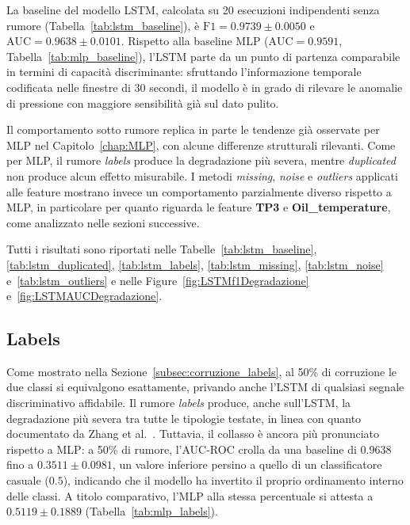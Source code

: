\documentclass[../main.tex]{subfiles}
\begin{document}
La baseline del modello LSTM, calcolata su 20 esecuzioni indipendenti senza rumore (Tabella~\ref{tab:lstm_baseline}), è $\text{F1} = 0.9739 \pm 0.0050$ e $\text{AUC} = 0.9638 \pm 0.0101$. Rispetto alla baseline MLP ($\text{AUC} = 0.9591$, Tabella~\ref{tab:mlp_baseline}), l'LSTM parte da un punto di partenza comparabile in termini di capacità discriminante: sfruttando l'informazione temporale codificata nelle finestre di 30 secondi, il modello è in grado di rilevare le anomalie di pressione con maggiore sensibilità già sul dato pulito.

Il comportamento sotto rumore replica in parte le tendenze già osservate per MLP nel Capitolo~\ref{chap:MLP}, con alcune differenze strutturali rilevanti. Come per MLP, il rumore \textit{labels} produce la degradazione più severa, mentre \textit{duplicated} non produce alcun effetto misurabile. I metodi \textit{missing}, \textit{noise} e \textit{outliers} applicati alle feature mostrano invece un comportamento parzialmente diverso rispetto a MLP, in particolare per quanto riguarda le feature \textbf{TP3} e \textbf{Oil\_temperature}, come analizzato nelle sezioni successive.

Tutti i risultati sono riportati nelle Tabelle~\ref{tab:lstm_baseline}, \ref{tab:lstm_duplicated}, \ref{tab:lstm_labels}, \ref{tab:lstm_missing}, \ref{tab:lstm_noise} e~\ref{tab:lstm_outliers} e nelle Figure~\ref{fig:LSTMf1Degradazione} e~\ref{fig:LSTMAUCDegradazione}.

\newpage

\subsection{Labels}
Come mostrato nella Sezione~\ref{subsec:corruzione_labels}, al 50\% di corruzione le due classi si equivalgono esattamente, privando anche l'LSTM di qualsiasi segnale discriminativo affidabile. Il rumore \textit{labels} produce, anche sull'LSTM, la degradazione più severa tra tutte le tipologie testate, in linea con quanto documentato da Zhang et al.~\cite{zhang2017understandingdeeplearningrequires}. Tuttavia, il collasso è ancora più pronunciato rispetto a MLP: a 50\% di rumore, l'AUC-ROC crolla da una baseline di $0.9638$ fino a $\mathbf{0.3511 \pm 0.0981}$, un valore inferiore persino a quello di un classificatore casuale ($0.5$), indicando che il modello ha invertito il proprio ordinamento interno delle classi. A titolo comparativo, l'MLP alla stessa percentuale si attesta a $0.5119 \pm 0.1889$ (Tabella~\ref{tab:mlp_labels}).
\end{document}
